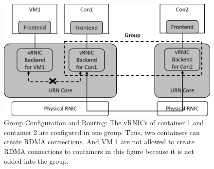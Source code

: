 




\begin{figure}[!ht]
	\centering
	\includegraphics[width=1.0\linewidth]{images/route-config}
	\caption{Group Configuration and Routing: The vRNICs of container 1 and container 2 are configured in one group. Thus, two containers can create RDMA connections. And VM 1 are not allowed to create RDMA connections to containers in this figure because it is not added into the group. }
	\label{fig:route-config}
\end{figure}


